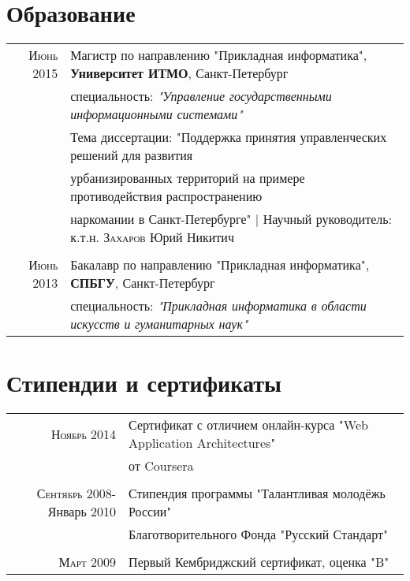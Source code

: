 \documentclass[a4paper,10pt]{article} %
\begin{document}

\section{Образование}

\begin{tabular}{rl}	
    \textsc{Июнь} 2015 & Магистр по направлению "Прикладная информатика",
        \textbf{Университет ИТМО}, Санкт-Петербург\\
        & специальность: \small\emph{"Управление государственными информационными
            системами"}
\medskip
\\
& Тема диссертации: "Поддержка принятия управленческих решений для развития
\\&
урбанизированных территорий на примере противодействия распространению
\\&
наркомании в Санкт-Петербурге" | \small Научный руководитель:  к.т.н.
\textsc{Захаров} Юрий
Никитич \\

\multicolumn{2}{c}{} \\

\textsc{Июнь} 2013 & Бакалавр по направлению "Прикладная информатика",
\textbf{СПБГУ}, Санкт-Петербург\\
& специальность: \small\emph{"Прикладная информатика в области искусств и
    гуманитарных наук"}
\end{tabular}


\section{Стипендии и сертификаты}

\begin{tabular}{rl}
    \textsc{Ноябрь} 2014& Сертификат с отличием онлайн-курса "Web Application Architectures"
     \\&от Coursera\\
\multicolumn{2}{c}{} \\
    \textsc{Сентябрь} 2008-Январь 2010& Стипендия программы "Талантливая
    молодёжь России" \\&Благотворительного Фонда "Русский Стандарт"\\
\multicolumn{2}{c}{} \\
    \textsc{Март} 2009& Первый Кембриджский сертификат, оценка "B"
\\
\end{tabular}
\end{document}
